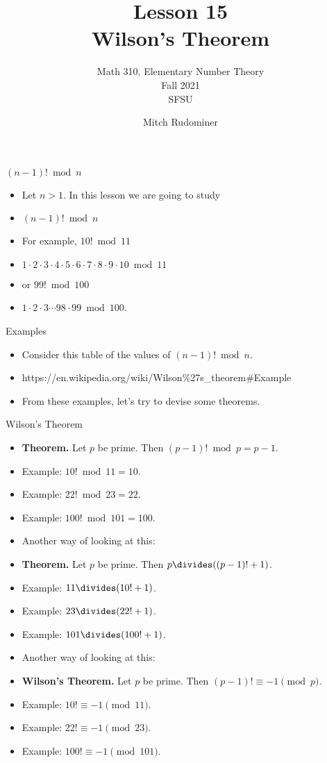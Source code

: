 \documentclass[handout]{beamer}
\title{Lesson 15 \\ Wilson's Theorem}
\subtitle{Math 310, Elementary Number Theory \\ Fall 2021 \\ SFSU}
\author{Mitch Rudominer}
\date{}
\begin{document}
\begin{frame}
  \titlepage
\end{frame}

\begin{frame}{$(n-1)! \bmod n$}

\begin{itemize}
  \item Let $n>1$. In this lesson we are going to study
  \item $(n-1)! \bmod n$
  \item For example, $10! \bmod 11$
  \item $1\cdot 2\cdot 3 \cdot 4 \cdot 5 \cdot 6 \cdot 7 \cdot 8 \cdot 9 \cdot 10 \bmod 11$
  \item or $99! \bmod 100$
  \item $1\cdot 2 \cdot 3 \cdots 98 \cdot 99 \bmod 100$.
\end{itemize}

\end{frame}

\begin{frame}{Examples}

\begin{itemize}
  \item Consider this table of the values of $(n-1)! \bmod n$.
  \item https://en.wikipedia.org/wiki/Wilson\%27s\_theorem\#Example
  \item From these examples, let's try to devise some theorems.
\end{itemize}

\end{frame}

\begin{frame}{Wilson's Theorem}

\begin{itemize}
  \item \textbf{Theorem.} Let $p$ be prime. Then $(p-1)! \bmod p = p-1$.
  \item Example: $10! \bmod 11 = 10$.
  \item Example: $22! \bmod 23 = 22$.
  \item Example: $100! \bmod 101 = 100$.
  \item Another way of looking at this:
  \item \textbf{Theorem.} Let $p$ be prime. Then $p \divides ((p-1)! + 1)$.
  \item Example: $11 \divides (10!+1)$.
  \item Example: $23 \divides (22!+1)$.
  \item Example: $101 \divides (100! + 1)$.
  \item Another way of looking at this:
  \item \textbf{Wilson's Theorem.} Let $p$ be prime. Then $(p-1)! \equiv -1 \pmod p$.
  \item Example: $10! \equiv -1  \pmod {11}$.
  \item Example: $22! \equiv -1  \pmod {23}$.
  \item Example: $100! \equiv -1 \pmod {101}$.
\end{itemize}

\end{frame}
\end{document}
